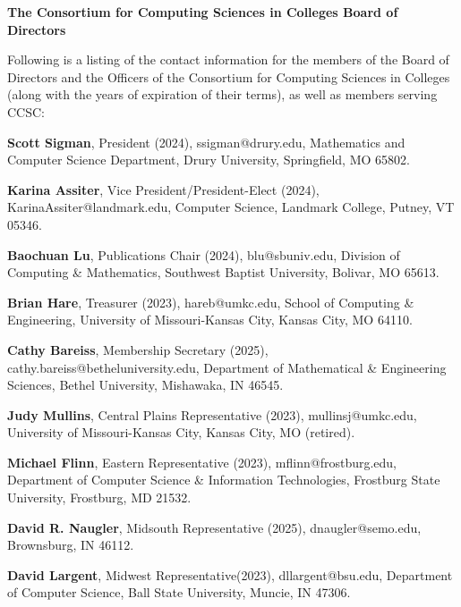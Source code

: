 \documentclass{article}
\begin{document}
\begingroup
  \centering
  \textbf{\large The Consortium for Computing Sciences in Colleges Board of Directors\\}
\endgroup

\begin{multicols}{2}
\begin{raggedright}

\small{

\noindent
Following is a listing of the contact information for the members of the Board
of Directors and the Officers of the Consortium for Computing Sciences in
Colleges (along with the years of expiration of their terms), as well as members
serving CCSC:

\noindent
\textbf{Scott Sigman}, President (2024), ssigman@drury.edu,
Mathematics and Computer Science Department, Drury University, Springfield, MO 65802.

\noindent
\textbf{Karina Assiter}, Vice President/President-Elect (2024), KarinaAssiter@landmark.edu,
Computer Science, Landmark College, Putney, VT 05346.

\noindent
\textbf{Baochuan Lu}, Publications Chair (2024),
blu@sbuniv.edu, Division of Computing \& Mathematics, Southwest Baptist University, Bolivar, MO 65613.

\noindent
\textbf{Brian Hare}, Treasurer (2023), hareb@umkc.edu,
School of Computing \& Engineering, University of Missouri-Kansas City, Kansas City, MO 64110.

\noindent
\textbf{Cathy Bareiss}, Membership Secretary (2025), cathy.bareiss@betheluniversity.edu,
Department of Mathematical \& Engineering Sciences, Bethel University, Mishawaka, IN 46545.

\noindent
\textbf{Judy Mullins}, Central Plains Representative (2023), mullinsj@umkc.edu, University of Missouri-Kansas City, Kansas City, MO (retired).

\noindent
\textbf{Michael Flinn}, Eastern Representative (2023), mflinn@frostburg.edu,
Department of Computer Science \& Information Technologies,
Frostburg State University, Frostburg, MD 21532.

\vspace{10pt}
\noindent
\textbf{David R. Naugler}, Midsouth Representative (2025),
dnaugler@semo.edu, Brownsburg, IN 46112.

\noindent
\textbf{David Largent}, Midwest Representative(2023), dllargent@bsu.edu,
Department of Computer Science,
Ball State University,
Muncie, IN 47306.

}
\end{raggedright}
\end{multicols}
\end{document}
